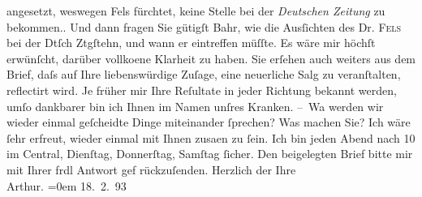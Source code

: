 \begin{ledgroupsized}[t]{13cm}
{{{                  angesetzt, weswegen Fels fürchtet, keine
                  Stelle bei der \emph{Deutschen Zeitung} zu
                  bekommen.}}}\label{K_L00178_1h}. Und dann fragen Sie gütigſt Bahr, wie die Ausſichten des Dr. \textsc{Fels} bei der Dtſch Ztgſtehn, und wann er eintreffen müſſte. Es wäre mir
               höchſt erwünſcht, darüber vollko{\geminationm}ene Klarheit zu haben.
               Sie erſehen auch {\pb}weiters aus dem Brief, daſs auf Ihre
               liebenswürdige Zuſage, eine neuerliche Sa{\geminationm}lg zu
               veranſtalten, reflectirt wird. Je früher mir Ihre Reſultate in jeder Richtung bekannt
               werden, umſo dankbarer bin ich Ihnen im Namen unſres Kranken.\pend
           \pstart
           – Wa{\geminationn} werden wir wieder einmal geſcheidte Dinge {\pb}miteinander ſprechen? Was machen Sie? Ich wäre ſehr
               erfreut, wieder einmal mit Ihnen zusa{\geminationm}en zu ſein. Ich
               bin jeden Abend nach 10 im Central, Dienſtag,
               Donnerſtag, Samſtag ſicher. Den beigelegten Brief bitte mir mit Ihrer frdl Antwort
               gef rückzuſenden.\pend
           \pstart
           {\pb}Herzlich der Ihre{\\[\baselineskip]}\spacefill\mbox{Arthur.}\pend
           \leftskip=0em{}\pstart
           \raggedleft{}18. 2. 93\pend
           
         
         \endnumbering{}\end{ledgroupsized}  \newcommand{\dateiname}{L00178}\newcommand{\titel}{Arthur Schnitzler an Hugo von Hofmannsthal, 18. 2. 1893}\newcommand{\editorInnen}{ Martin Anton Müller und Gerd-Hermann Susen}
      